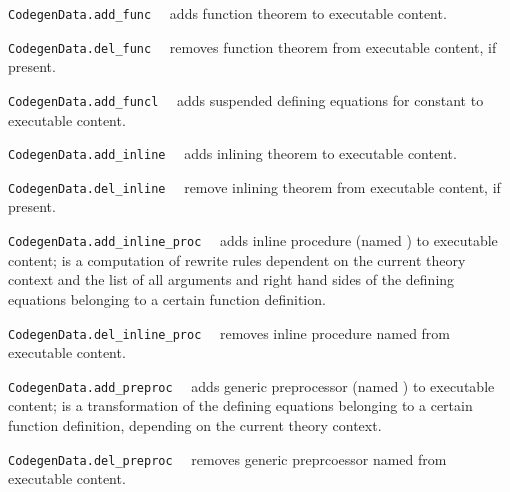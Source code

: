 \begin{isabellebody}
\begin{isamarkuptext}
  \begin{description}

  \item \verb|CodegenData.add_func|~~ adds function
     theorem  to executable content.

  \item \verb|CodegenData.del_func|~~ removes function
     theorem  from executable content, if present.

  \item \verb|CodegenData.add_funcl|~~ adds
     suspended defining equations  for constant
      to executable content.

  \item \verb|CodegenData.add_inline|~~ adds
     inlining theorem  to executable content.

  \item \verb|CodegenData.del_inline|~~ remove
     inlining theorem  from executable content, if present.

  \item \verb|CodegenData.add_inline_proc|~~ adds
     inline procedure  (named ) to executable content;
      is a computation of rewrite rules dependent on
     the current theory context and the list of all arguments
     and right hand sides of the defining equations belonging
     to a certain function definition.

  \item \verb|CodegenData.del_inline_proc|~~ removes
     inline procedure named  from executable content.

  \item \verb|CodegenData.add_preproc|~~ adds
     generic preprocessor  (named ) to executable content;
      is a transformation of the defining equations belonging
     to a certain function definition, depending on the
     current theory context.

  \item \verb|CodegenData.del_preproc|~~ removes
     generic preprcoessor named  from executable content.


\end{description}
\end{isamarkuptext}
\end{isabellebody}
